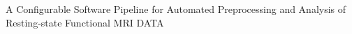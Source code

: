 A Configurable Software Pipeline for Automated Preprocessing and Analysis of Resting-state Functional MRI DATA
